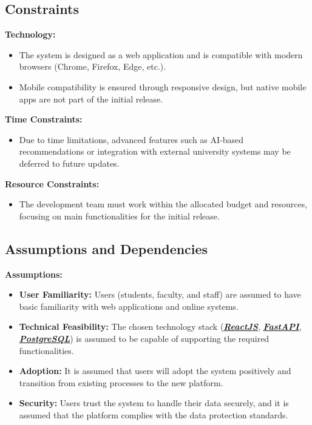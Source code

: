 \documentclass[11pt]{article}
\newcommand{\ReactJS}{\href{https://react.dev/}{\textbf{\textcolor{reactColor}{\textit{ReactJS}}}}}
\newcommand{\FastAPI}{\href{https://fastapi.tiangolo.com/}{\textbf{{\textcolor{fastAPIColor}{\textit{FastAPI}}}}}}
\newcommand{\PostgreSQL}{\href{https://www.postgresql.org/}{\textbf{{\textcolor{postgresColor}{\textit{PostgreSQL}}}}}}
\begin{document}
\subsection{Constraints}

\textbf{Technology:}
\begin{itemize}
    \item The system is designed as a web application and is compatible with modern browsers (Chrome, Firefox, Edge, etc.).
    \item Mobile compatibility is ensured through responsive design, but native mobile apps are not part of the initial release.
\end{itemize}

\textbf{Time Constraints:}
\begin{itemize}
    \item Due to time limitations, advanced features such as AI-based recommendations or integration with external university systems may be deferred to future updates.
\end{itemize}

\textbf{Resource Constraints:}
\begin{itemize}
    \item The development team must work within the allocated budget and resources, focusing on main functionalities for the initial release.
\end{itemize}

\subsection{Assumptions and Dependencies}

\textbf{Assumptions:}
\begin{itemize}
    \item \textbf{User Familiarity:} Users (students, faculty, and staff) are assumed to have basic familiarity with web applications and online systems.
    \item \textbf{Technical Feasibility:} The chosen technology stack (\ReactJS, \FastAPI, \PostgreSQL) is assumed to be capable of supporting the required functionalities.
    \item \textbf{Adoption:} It is assumed that users will adopt the system positively and transition from existing processes to the new platform.
    \item \textbf{Security:} Users trust the system to handle their data securely, and it is assumed that the platform complies with the data protection standards.
\end{itemize}
\end{document}

